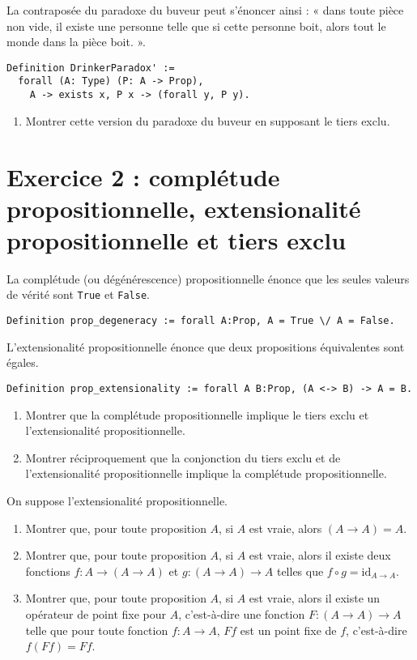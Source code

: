\documentclass{article}
\begin{document}
La contraposée du paradoxe du buveur peut s'énoncer ainsi : « dans toute pièce non vide, il existe une personne telle que si cette personne boit, alors tout le monde dans la pièce boit. ».

\begin{verbatim}
Definition DrinkerParadox' :=
  forall (A: Type) (P: A -> Prop),
    A -> exists x, P x -> (forall y, P y).
\end{verbatim}

\begin{enumerate}[resume]
\item Montrer cette version du paradoxe du buveur en supposant le tiers exclu.
\end{enumerate}

\section*{Exercice 2 : complétude propositionnelle,  extensionalité propositionnelle et tiers exclu}

La complétude (ou dégénérescence) propositionnelle énonce que les seules valeurs de vérité sont \texttt{True} et \texttt{False}.

\begin{verbatim}
Definition prop_degeneracy := forall A:Prop, A = True \/ A = False.
\end{verbatim}

L'extensionalité propositionnelle énonce que deux propositions équivalentes sont égales.

\begin{verbatim}
Definition prop_extensionality := forall A B:Prop, (A <-> B) -> A = B.
\end{verbatim}

\begin{enumerate}
\item Montrer que la complétude propositionnelle implique le tiers exclu et l'extensionalité propositionnelle.
\item Montrer réciproquement que la conjonction du tiers exclu et de l'extensionalité propositionnelle implique la complétude propositionnelle.
\end{enumerate}

On suppose l'extensionalité propositionnelle.

\begin{enumerate}[resume]
\item Montrer que, pour toute proposition \(A\), si \(A\) est vraie, alors \((A \rightarrow A) = A\).
\item Montrer que, pour toute proposition \(A\), si \(A\) est vraie, alors il existe deux fonctions \(f : A \rightarrow (A \rightarrow A)\)
et \(g : (A \rightarrow A) \rightarrow A\) telles que \(f \circ g = \mathrm{id}_{A \rightarrow A}\).
\item Montrer que, pour toute proposition \(A\), si \(A\) est vraie, alors il existe un opérateur de point fixe pour \(A\), c'est-à-dire une
  fonction \(F : (A \rightarrow A) \rightarrow A\) telle que pour toute fonction \(f: A \rightarrow A\), \(F f\) est un point fixe de \(f\),
  c'est-à-dire \(f (F f) = F f\).
\end{enumerate}
\end{document}
